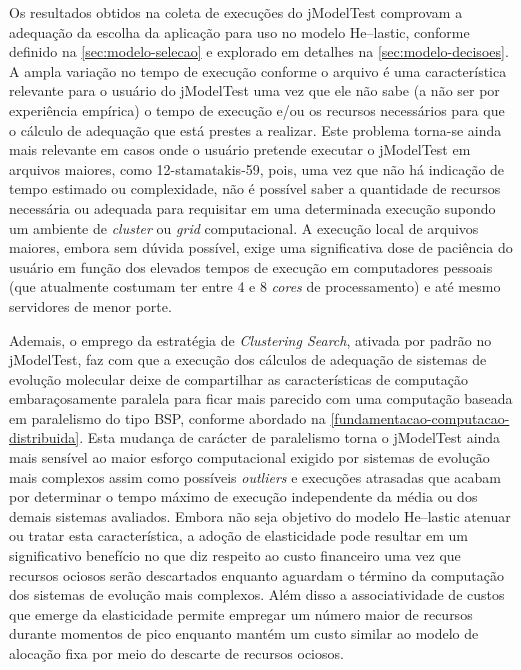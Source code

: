 \documentclass[english,brazilian]{UNISINOSmonografia} %
\begin{document}
Os resultados obtidos na coleta de execuções do jModelTest comprovam a adequação da escolha da aplicação para uso no modelo \textsf{He}--lastic, conforme definido na \autoref{sec:modelo-selecao} e explorado em detalhes na \autoref{sec:modelo-decisoes}.
%
A ampla variação no tempo de execução conforme o arquivo é uma característica relevante para o usuário do jModelTest uma vez que ele não sabe (a não ser por experiência empírica) o tempo de execução e/ou os recursos necessários para que o cálculo de adequação que está prestes a realizar.
%
Este problema torna-se ainda mais relevante em casos onde o usuário pretende executar o jModelTest em arquivos maiores, como 12-stamatakis-59, pois, uma vez que não há indicação de tempo estimado ou complexidade, não é possível saber a quantidade de recursos necessária ou adequada para requisitar em uma determinada execução supondo um ambiente de \textit{cluster} ou \textit{grid} computacional.
%
A execução local de arquivos maiores, embora sem dúvida possível, exige uma significativa dose de paciência do usuário em função dos elevados tempos de execução em computadores pessoais (que atualmente costumam ter entre 4 e 8 \textit{cores} de processamento) e até mesmo servidores de menor porte.



Ademais, o emprego da estratégia de \textit{Clustering Search}, ativada por padrão no jModelTest, faz com que a execução dos cálculos de adequação de sistemas de evolução molecular deixe de compartilhar as características de computação embaraçosamente paralela para ficar mais parecido com uma computação baseada em paralelismo do tipo BSP, conforme abordado na \autoref{fundamentacao-computacao-distribuida}.
%
Esta mudança de carácter de paralelismo torna o jModelTest ainda mais sensível ao maior esforço computacional exigido por sistemas de evolução mais complexos assim como possíveis \textit{outliers} e execuções atrasadas que acabam por determinar o tempo máximo de execução independente da média ou dos demais sistemas avaliados.
%
Embora não seja objetivo do modelo \textsf{He}--lastic atenuar ou tratar esta característica, a adoção de elasticidade pode resultar em um significativo benefício no que diz respeito ao custo financeiro uma vez que recursos ociosos serão descartados enquanto aguardam o término da computação dos sistemas de evolução mais complexos.
%
Além disso a associatividade de custos que emerge da elasticidade permite empregar um número maior de recursos durante momentos de pico enquanto mantém um custo similar ao modelo de alocação fixa por meio do descarte de recursos ociosos.
\end{document}
